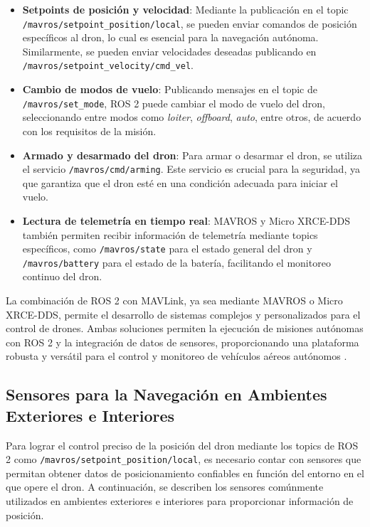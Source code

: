         \begin{itemize}
            \item \textbf{Setpoints de posición y velocidad}: Mediante la publicación en el topic \texttt{/mavros/setpoint\_position/local}, se pueden enviar comandos de posición específicos al dron, lo cual es esencial para la navegación autónoma. Similarmente, se pueden enviar velocidades deseadas publicando en \texttt{/mavros/setpoint\_velocity/cmd\_vel}.
            
            \item \textbf{Cambio de modos de vuelo}: Publicando mensajes en el topic de \texttt{/mavros/set\_mode}, ROS 2 puede cambiar el modo de vuelo del dron, seleccionando entre modos como \textit{loiter}, \textit{offboard}, \textit{auto}, entre otros, de acuerdo con los requisitos de la misión.
    
            \item \textbf{Armado y desarmado del dron}: Para armar o desarmar el dron, se utiliza el servicio \texttt{/mavros/cmd/arming}. Este servicio es crucial para la seguridad, ya que garantiza que el dron esté en una condición adecuada para iniciar el vuelo.
    
            \item \textbf{Lectura de telemetría en tiempo real}: MAVROS y Micro XRCE-DDS también permiten recibir información de telemetría mediante topics específicos, como \texttt{/mavros/state} para el estado general del dron y \texttt{/mavros/battery} para el estado de la batería, facilitando el monitoreo continuo del dron.
        \end{itemize}
    
        La combinación de ROS 2 con MAVLink, ya sea mediante MAVROS o Micro XRCE-DDS, permite el desarrollo de sistemas complejos y personalizados para el control de drones. Ambas soluciones permiten la ejecución de misiones autónomas con ROS 2 y la integración de datos de sensores, proporcionando una plataforma robusta y versátil para el control y monitoreo de vehículos aéreos autónomos \cite{px4_ros2}.
    
\subsection{Sensores para la Navegación en Ambientes Exteriores e Interiores}
    Para lograr el control preciso de la posición del dron mediante los topics de ROS 2 como \texttt{/mavros/setpoint\_position/local}, es necesario contar con sensores que permitan obtener datos de posicionamiento confiables en función del entorno en el que opere el dron. A continuación, se describen los sensores comúnmente utilizados en ambientes exteriores e interiores para proporcionar información de posición.
    
